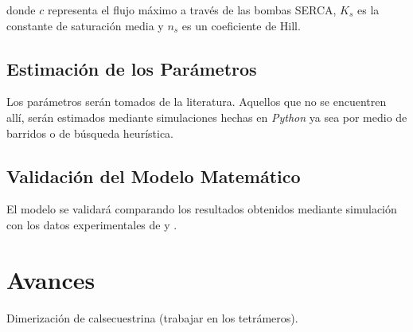 \documentclass[draft]{article}
\begin{document}
donde $c$ representa el flujo máximo a través de las bombas SERCA, $K_s$ es la constante de saturación media y $n_s$ es un coeficiente de Hill.

\subsection{Estimación de los Parámetros}

Los parámetros serán tomados de la literatura. Aquellos que no se encuentren allí, serán estimados mediante simulaciones hechas en \textit{Python} ya sea por medio de barridos o de búsqueda heurística.

\subsection{Validación del Modelo Matemático}

El modelo se validará comparando los resultados obtenidos mediante simulación con los datos experimentales de \cite{Guerrero-Hernandez2010} y \cite{Perez-Rosas2015}.
\section{Avances}

Dimerización de calsecuestrina (trabajar en los tetrámeros).






 


\end{document}
